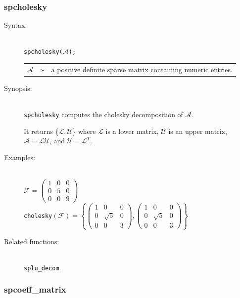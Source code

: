 \subsubsection{spcholesky}
\label{sparse:spcholesky}
\hypertarget{operator:SPCHOLESKY}{}

\begin{description}
\item[Syntax:]\mbox{}\\
{\tt spcholesky($\mathcal{A}$);}\\[2mm]
\begin{tabular}{l l l}
$\mathcal{A}$ &:-& a positive definite sparse matrix containing numeric entries.
\end{tabular}

\item[Synopsis:]\mbox{}\\
\texttt{spcholesky} computes the cholesky decomposition of $\mathcal{A}$.

It returns \{$\mathcal{L,U}$\} where $\mathcal{L}$
is a lower matrix, $\mathcal{U}$ is an upper matrix, \\ $\mathcal{A} =
\mathcal{LU}$, and $\mathcal{U} = \mathcal{L}^T$.

\item[Examples:]\mbox{}\\
\(\mathcal{F} = \begin{pmatrix} 1 & 0 & 0 \\ 0 & 5 & 0 \\ 0 & 0 & 9 \end{pmatrix}\) \\[2mm]
\texttt{cholesky}\((\mathcal{F})  =
\left\{
   \begin{pmatrix} 1 & 0 & 0 \\ 0 & \sqrt{5} & 0 \\ 0 & 0& 3 \end{pmatrix},
   \begin{pmatrix} 1 & 0 & 0 \\ 0 & \sqrt{5} & 0 \\ 0 & 0 & 3 \end{pmatrix}
\right\}\)

\item[Related functions:]\mbox{}\\
\texttt{splu\_decom}.
\end{description}

\subsubsection{spcoeff\_matrix}
\label{sparse:spcoeff_matrix}
\hypertarget{operator:SPCOEFF_MATRIX}{}

